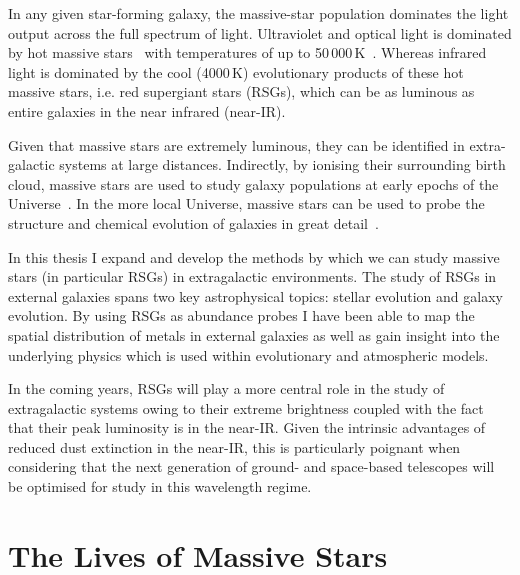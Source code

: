 In any given star-forming galaxy, the massive-star population dominates the light output across the full spectrum of light.
Ultraviolet and optical light is dominated by hot massive stars~\citep{1998ARA&A..36..189K,2012ARA&A..50..531K} with temperatures of up to 50\,000\,K~\citep[e.g.][]{2011A&A...530L..14B}.
Whereas infrared light is dominated by the cool (4000\,K) evolutionary products of these hot massive stars, i.e. red supergiant stars (RSGs), which can be as luminous as entire galaxies in the near infrared (near-IR).

Given that massive stars are extremely luminous, they can be identified in extra-galactic systems at large distances.
Indirectly, by ionising their surrounding birth cloud, massive stars are used to study galaxy populations at early epochs of the Universe~\citep{2004MNRAS.348L..59P}.
In the more local Universe, massive stars can be used to probe the structure and chemical evolution of galaxies in great detail~\citep{2007ApJ...659.1198E,2008ApJ...681..269K,2008MNRAS.386..826E,2010AN....331..459K,2011A&A...530A.108E,2012A&A...542A..79C}.

In this thesis I expand and develop the methods by which we can study massive stars (in particular RSGs) in extragalactic environments.
The study of RSGs in external galaxies spans two key astrophysical topics: stellar evolution and galaxy evolution.
By using RSGs as abundance probes I have been able to map the spatial distribution of metals in external galaxies as well as gain insight into the underlying physics which is used within evolutionary and atmospheric models.

In the coming years, RSGs will play a more central role in the study of extragalactic systems owing to their extreme brightness coupled with the fact that their peak luminosity is in the near-IR. Given the intrinsic advantages of reduced dust extinction in the near-IR, this is particularly poignant when considering that the next generation of ground- and space-based telescopes will be optimised for study in this wavelength regime.


\section{The Lives of Massive Stars} %
\label{sec:lives}

